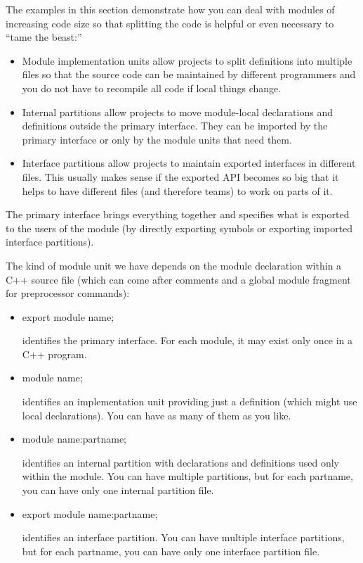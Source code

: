 
The examples in this section demonstrate how you can deal with modules of increasing code size so that splitting the code is helpful or even necessary to “tame the beast:”

\begin{itemize}
\item 
Module implementation units allow projects to split definitions into multiple files so that the source code can be maintained by different programmers and you do not have to recompile all code if local things change.

\item 
Internal partitions allow projects to move module-local declarations and definitions outside the primary interface. They can be imported by the primary interface or only by the module units that need them.

\item 
Interface partitions allow projects to maintain exported interfaces in different files. This usually makes sense if the exported API becomes so big that it helps to have different files (and therefore teams) to work on parts of it.
\end{itemize}

The primary interface brings everything together and specifies what is exported to the users of the module (by directly exporting symbols or exporting imported interface partitions).

The kind of module unit we have depends on the module declaration within a C++ source file (which can come after comments and a global module fragment for preprocessor commands):

\begin{itemize}
\item 
export module name; 

identifies the primary interface. For each module, it may exist only once in a C++ program.

\item 
module name; 

identifies an implementation unit providing just a definition (which might use local declarations). You can have as many of them as you like.

\item 
module name:partname; 

identifies an internal partition with declarations and definitions used only within the module. You can have multiple partitions, but for each partname, you can have only one internal partition file.

\item 
export module name:partname; 

identifies an interface partition. You can have multiple interface partitions, but for each partname, you can have only one interface partition file.
\end{itemize}

